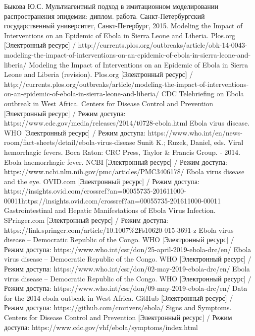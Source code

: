 \begin{thebibliography}{}
	 Быкова Ю.С. Мультиагентный подход в имитационном моделировании распространения эпидемии: диплом. работа. Санкт-Петербургский государственный университет, Санкт-Петербург, 2015. 
	 Modeling the Impact of Interventions on an Epidemic of Ebola in Sierra Leone and Liberia. Plos.org [Электронный ресурс] / http://currents.plos.org/outbreaks/article/obk-14-0043-modeling-the-impact-of-interventions-on-an-epidemic-of-ebola-in-sierra-leone-and-liberia/
	 Modeling the Impact of Interventions on an Epidemic of Ebola in Sierra Leone and Liberia (revision). Plos.org [Электронный ресурс] / http://currents.plos.org/outbreaks/article/modeling-the-impact-of-interventions-on-an-epidemic-of-ebola-in-sierra-leone-and-liberia/
	 CDC Telebriefing on Ebola outbreak in West Africa. Centers for Disease Control and Prevention [Электронный ресурс] / Режим доступа: https://www.cdc.gov/media/releases/2014/t0728-ebola.html
	 Ebola virus disease. WHO [Электронный ресурс] / Режим доступа: https://www.who.int/en/news-room/fact-sheets/detail/ebola-virus-disease
	Sunit K.; Ruzek, Daniel, eds. Viral hemorrhagic fevers. Boca Raton: CRC Press, Taylor \& Francis Group. - 2014.
	 Ebola haemorrhagic fever. NCBI [Электронный ресурс] / Режим доступа: https://www.ncbi.nlm.nih.gov/pmc/articles/PMC3406178/
	 Ebola virus disease and the eye. OVID.com [Электронный ресурс] / Режим доступа: https://insights.ovid.com/crossref?an=00055735-201611000-00011https://insights.ovid.com/crossref?an=00055735-201611000-00011
	 Gastrointestinal and Hepatic Manifestations of Ebola Virus Infection. SPringer.com [Электронный ресурс] / Режим доступа: https://link.springer.com/article/10.1007\%2Fs10620-015-3691-z
	 Ebola virus disease – Democratic Republic of the Congo. WHO [Электронный ресурс] / Режим доступа: https://www.who.int/csr/don/25-april-2019-ebola-drc/en/
	 Ebola virus disease – Democratic Republic of the Congo. WHO [Электронный ресурс] / Режим доступа: https://www.who.int/csr/don/02-may-2019-ebola-drc/en/
	 Ebola virus disease – Democratic Republic of the Congo. WHO [Электронный ресурс] / Режим доступа: https://www.who.int/csr/don/09-may-2019-ebola-drc/en/
	 Data for the 2014 ebola outbeak in West Africa. GitHub [Электронный ресурс] / Режим доступа: https://github.com/cmrivers/ebola/
	 Signs and Symptoms. Centers for Disease Control and Prevention [Электронный ресурс] / Режим доступа: https://www.cdc.gov/vhf/ebola/symptoms/index.html

\end{thebibliography}
